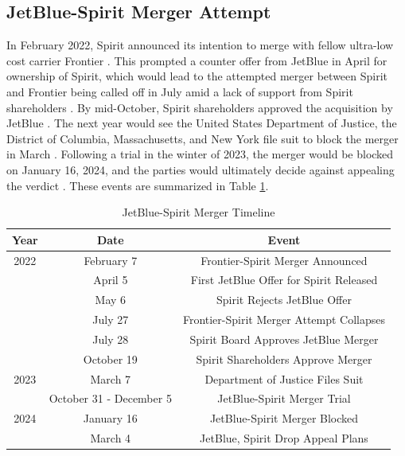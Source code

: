 \documentclass{article}
\begin{document}
	\subsection{JetBlue-Spirit Merger Attempt}
	\label{sec:Setting_Merger}
	In February 2022, Spirit announced its intention to merge with fellow ultra-low cost carrier Frontier \citep{schaper_frontier-spirit_2022}. This prompted a counter offer from JetBlue in April for ownership of Spirit, which would lead to the attempted merger between Spirit and Frontier being called off in July amid a lack of support from Spirit shareholders \citep{josephs_jetblue_2022, josephs_spirit_2022}. By mid-October, Spirit shareholders approved the acquisition by JetBlue \citep{koenig_spirit_2022}. The next year would see the United States Department of Justice, the District of Columbia, Massachusetts, and New York file suit to block the merger in March \citep{chokshi_justice_2023}. Following a trial in the winter of 2023, the merger would be blocked on January 16, 2024, and the parties would ultimately decide against appealing the verdict \citep{chapman_jetblue_2024}.  These events are summarized in Table \ref{tab:JetBlue_Spirit_Timeline}. 

    	\begin{table}[tb]
		\caption{JetBlue-Spirit Merger Timeline}
		\label{tab:JetBlue_Spirit_Timeline}
		\begin{center}
			\begin{tabular}{ccc}
				\hline
				Year & Date & Event \\
				\hline
				2022 & February 7 & Frontier-Spirit Merger Announced \\
				& April 5 &  First JetBlue Offer for Spirit Released\\
				& May 6 & Spirit Rejects JetBlue Offer \\
				& July 27 &  Frontier-Spirit Merger Attempt Collapses\\
				& July 28 &  Spirit Board Approves JetBlue Merger\\
				& October 19 & Spirit Shareholders Approve Merger \\
				\hline
				2023 & March 7 &  Department of Justice Files Suit\\
				& October 31 - December 5 &  JetBlue-Spirit Merger Trial \\
				\hline
				2024 & January 16 & JetBlue-Spirit Merger Blocked \\
				& March 4 & JetBlue, Spirit Drop Appeal Plans \\
			\end{tabular}
		\end{center}
	\end{table}
\end{document}
